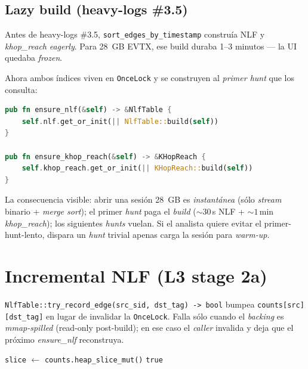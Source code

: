 \subsection{Lazy build (heavy-logs \#3.5)}

Antes de heavy-logs \#3.5, \texttt{sort\_edges\_by\_timestamp}
construía NLF y \emph{khop\_reach} \emph{eagerly}. Para 28~GB EVTX,
ese build duraba 1--3 minutos --- la UI quedaba \emph{frozen}.

Ahora ambos índices viven en \texttt{OnceLock} y se construyen al
\emph{primer hunt} que los consulta:

\begin{lstlisting}[language=Rust]
pub fn ensure_nlf(&self) -> &NlfTable {
    self.nlf.get_or_init(|| NlfTable::build(self))
}

pub fn ensure_khop_reach(&self) -> &KHopReach {
    self.khop_reach.get_or_init(|| KHopReach::build(self))
}
\end{lstlisting}

\begin{intuicion}
La consecuencia visible: abrir una sesión 28~GB es \emph{instantánea}
(sólo \emph{stream} binario + \emph{merge sort}); el primer
\emph{hunt} paga el \emph{build} (\(\sim 30\)\,s NLF + \(\sim 1\)\,min
\emph{khop\_reach}); los siguientes \emph{hunts} vuelan. Si el
analista quiere evitar el primer-hunt-lento, dispara un \emph{hunt}
trivial apenas carga la sesión para \emph{warm-up}.
\end{intuicion}

\section{Incremental NLF (L3 stage 2a)}

\texttt{NlfTable::try\_record\_edge(src\_sid, dst\_tag) -> bool}
bumpea \texttt{counts[src][dst\_tag]} en lugar de invalidar la
\texttt{OnceLock}. Falla sólo cuando el \emph{backing} es
\emph{mmap-spilled} (read-only post-build); en ese caso el
\emph{caller} invalida y deja que el próximo \emph{ensure\_nlf}
reconstruya.

\begin{algorithm}[H]
\caption{\texttt{try\_record\_edge}}
\texttt{slice} $\leftarrow$ \texttt{counts.heap\_slice\_mut()}\;
\Return \texttt{true}\;
\end{algorithm}


